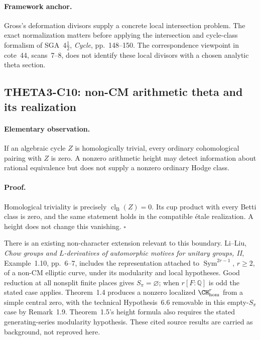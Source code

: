 \documentclass[11pt]{article}
\newcommand{\Q}{\mathbb Q}\newcommand{\C}{\mathbb C}\newcommand{\Z}{\mathbb Z}\newcommand{\R}{\mathbb R}\newcommand{\A}{\mathbb A}\newcommand{\OO}{\mathcal O}
\theoremstyle{definition}\newtheorem{definition}[theorem]{Definition}\newtheorem{remark}[theorem]{Remark}
\begin{document}
\paragraph{Framework anchor.}
Gross's deformation divisors supply a concrete local intersection problem.
The exact normalization matters before applying the intersection and
cycle-class formalism of SGA~4$\frac12$, \emph{Cycle}, pp.~148--150.
The correspondence viewpoint in cote~44, scans~7--8, does not identify
these local divisors with a chosen analytic theta section.

\subsection{THETA3-C10: non-CM arithmetic theta and its realization}\label{C10}

\paragraph{Elementary observation.}
If an algebraic cycle $Z$ is homologically trivial, every ordinary
cohomological pairing with $Z$ is zero. A nonzero arithmetic height
may detect information about rational equivalence but does not
supply a nonzero ordinary Hodge class.

\paragraph{Proof.}
Homological triviality is precisely
$\operatorname{cl}_{\mathrm B}(Z)=0$. Its cup product with every
Betti class is zero, and the same statement holds in the compatible
\'etale realization. A height does not change this vanishing.
$\square$

There is an existing non-character extension relevant to this
boundary. Li--Liu, \emph{Chow groups and $L$-derivatives of
automorphic motives for unitary groups, II}, Example~1.10,
pp.~6--7, includes the representation attached to
$\operatorname{Sym}^{2r-1}$, $r\geq2$, of a non-CM elliptic curve,
under its modularity and local hypotheses. Good reduction at all
nonsplit finite places gives $S_\pi=\varnothing$; when
$r[F:\Q]$ is odd the stated case applies. Theorem~1.4 produces a
nonzero localized $\CH^r_{\mathrm{hom}}$ from a simple central zero,
with the technical Hypothesis~6.6 removable in this empty-$S_\pi$
case by Remark~1.9. Theorem~1.5's height formula also requires the
stated generating-series modularity hypothesis. These cited source
results are carried as background, not reproved here.
\end{document}
